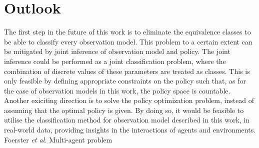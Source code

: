 
\chapter{Outlook}
\label{chap:6}
The first step in the future of this work is to eliminate the equivalence classes to be able to classify every observation model. This problem to a certain extent can be mitigated by joint inference of observation model and policy. The joint inference could be performed as a joint classification problem, where the combination of discrete values of these parameters are treated as classes. This is only feasible by defining appropriate constraints on the policy such that, as for the case of observation models in this work, the policy space is countable.\\ 
Another exiciting direction is to solve the policy optimization problem, instead of assuming that the optimal policy is given. By doing so, it would be feasible to utilise the classification method for observation model described in this work, in real-world data, providing insights in the interactions of agents and environments.\\
Foerster \textit{et al.} \cite{Foerster2016}
Multi-agent problem

